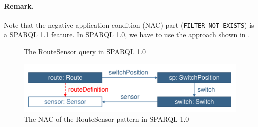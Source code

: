 \paragraph{Remark.} Note that the negative application condition (NAC) part (\texttt{FILTER NOT EXISTS}) is a SPARQL 1.1 feature. In SPARQL 1.0, we have to use the approach shown in .

\begin{figure}[Htb]
\centering
\begin{minipage}{0.6\textwidth}
  { \alignListing
    }
  \caption{The \textsf{RouteSensor} query in SPARQL 1.0}
  \label{lst:routesensor-sparql-nac10}
\end{minipage}
\end{figure}

% 
% 
% 

\begin{figure}[Htb]
		\centering
		\includegraphics[scale=0.4]{figures/trainbenchmark-routesensor}
		\caption{The NAC of the \textsf{RouteSensor} pattern in SPARQL 1.0}
		\label{fig:trainbenchmark-routesensor}
\end{figure}

